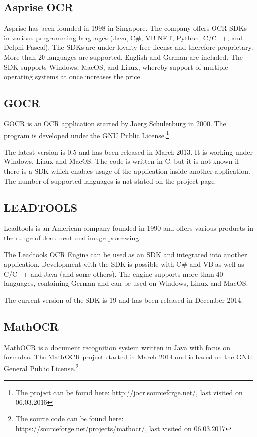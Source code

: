 \subsection{Asprise OCR}
\label{sec3.1.3}
Asprise has been founded in 1998 in Singapore. The company offers OCR SDKs in various programming languages (Java, C\#, VB.NET, Python, C/C++, and Delphi Pascal). The SDKs are under loyalty-free license and therefore proprietary. More than 20 languages are supported, English and German are included.
The SDK supports Windows, MacOS, and Linux, whereby support of multiple operating systems at once increases the price.

\subsection{GOCR}
\label{sec3.1.4}
GOCR is an OCR application started by Joerg Schulenburg in 2000. The program is developed under the GNU Public License.\footnote{The project can be found here: \url{http://jocr.sourceforge.net/}, last visited on 06.03.2016}

The latest version is 0.5 and has been released in March 2013. It is working under Windows, Linux and MacOS. The code is written in C, but it is not known if there is a SDK which enables usage of the application inside another application. The number of supported languages is not stated on the project page.

\subsection{LEADTOOLS}
\label{sec3.1.5}
Leadtools is an American company founded in 1990 and offers various products in the range of document and image processing. 

The Leadtools OCR Engine can be used as an SDK and integrated into another application. Development with the SDK is possible with C\# and VB as well as C/C++ and Java (and some others). The engine supports more than 40 languages, containing German and can be used on Windows, Linux and MacOS. 

The current version of the SDK is 19 and has been released in December 2014.

\subsection{MathOCR}
\label{sec3.1.6}
MathOCR is a document recognition system written in Java with focus on formulas. The MathOCR project started in March 2014 and is based on the GNU General Public License.\footnote{The source code can be found here: \url{https://sourceforge.net/projects/mathocr/}, last visited on 06.03.2017}


